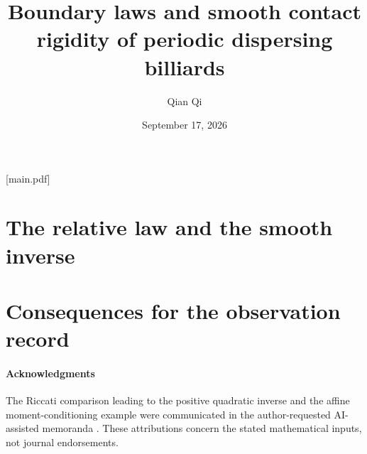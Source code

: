 
[main.pdf]
\title[Boundary laws and smooth contact rigidity]{Boundary laws and smooth contact rigidity of periodic dispersing billiards}
\author{Qian Qi}
\date{September 17, 2026}


\begin{abstract}

\end{abstract}
\maketitle
\setcounter{tocdepth}{1}
\tableofcontents

\part{The relative law and the smooth inverse}








\part{Consequences for the observation record}




\subsection*{Acknowledgments}
The Riccati comparison leading to the positive quadratic inverse and the
affine moment-conditioning example were communicated in the author-requested
AI-assisted memoranda \cite{A2ReviewV65,A2ReviewV74}.  These attributions
concern the stated mathematical inputs, not journal endorsements.
\appendix
\renewcommand{\theHsection}{principal.appendix.\arabic{section}}



